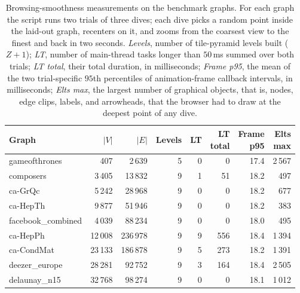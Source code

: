 \documentclass[review]{vgtc}          %
\begin{document}
\begin{table}[t]
  \caption{Browsing-smoothness measurements on the benchmark graphs.
    For each graph the script runs two trials of three dives; each dive picks
    a random point inside the laid-out graph, recenters on it, and
    zooms from the coarsest view to the finest and back in two
    seconds. \emph{Levels}, number of tile-pyramid levels built
    ($Z+1$);
    \emph{LT}, number of main-thread tasks longer than $50$\,ms
    summed over both trials; \emph{LT total}, their total
    duration, in milliseconds; \emph{Frame p95}, the
    mean of the two trial-specific $95$th percentiles of
    animation-frame callback intervals, in milliseconds;
    \emph{Elts max}, the largest number of graphical objects,
    that is, nodes, edge clips, labels, and arrowheads, that the
    browser had to draw at the deepest point of any dive.}
  \label{tab:smoothness}
  \centering
  \scriptsize
  \setlength{\tabcolsep}{2pt}
  \begin{tabular}{@{}lrrrrrrr@{}}
    \toprule
    Graph & $|V|$ & $|E|$ & Levels & LT & \shortstack{LT\\total} & \shortstack{Frame\\p95} & \shortstack{Elts\\max} \\
    \midrule
    gameofthrones      &     407 &   2\,639 & 5 &  0 &     0 &  17.4 &   2\,567 \\
    composers          &  3\,405 &  13\,832 & 9 &  1 &    51 &  18.2 &      497 \\
    ca-GrQc            &  5\,242 &  28\,968 & 9 &  0 &     0 &  18.2 &      677 \\
    ca-HepTh           &  9\,877 &  51\,946 & 9 &  0 &     0 &  18.2 &      383 \\
    facebook\_combined &  4\,039 &  88\,234 & 9 &  0 &     0 &  18.0 &      495 \\
    ca-HepPh           & 12\,008 & 236\,978 & 9 &  9 &   556 &  18.4 &   1\,394 \\
    ca-CondMat         & 23\,133 & 186\,878 & 9 &  5 &   273 &  18.2 &   1\,391 \\
    deezer\_europe     & 28\,281 &  92\,752 & 9 &  3 &   164 &  18.4 &   2\,505 \\
    delaunay\_n15      & 32\,768 &  98\,274 & 9 &  0 &     0 &  18.1 &   1\,012 \\
    \bottomrule
  \end{tabular}
\end{table}
\end{document}
